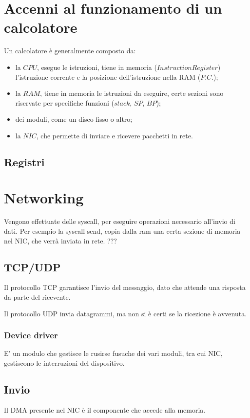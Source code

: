 \section{Accenni al funzionamento di un calcolatore}
Un calcolatore è generalmente composto da:
\begin{itemize}
  \item la $CPU$, esegue le istruzioni, tiene in memoria ($Instruction Register$)
    l'istruzione corrente e la posizione dell'istruzione nella RAM ($P.C.$);
  \item la $RAM$, tiene in memoria le istruzioni da eseguire, certe sezioni
    sono riservate per specifiche funzioni ($stack$, $SP$, $BP$);
  \item dei moduli, come un disco fisso o altro;
  \item la $NIC$, che permette di inviare e ricevere pacchetti in rete.
\end{itemize}

\subsection{Registri}
\section{Networking}
Vengono effettuate delle syscall, per eseguire operazioni necessario all'invio di dati.
Per esempio la syscall send, copia dalla ram una certa sezione di memoria nel NIC,
che verrà inviata in rete.
???

\subsection{TCP/UDP}
Il protocollo TCP garantisce l'invio del messaggio, dato che attende una risposta
da parte del ricevente.

Il protocollo UDP invia datagrammi, ma non si è certi se la ricezione è avvenuta.
\subsubsection{Device driver}
E' un modulo che gestisce le rusirse fusuche dei vari moduli, tra cui NIC,
gestiscono le interruzioni del dispositivo.

\subsection{Invio}
Il DMA presente nel NIC è il componente che accede alla memoria.


